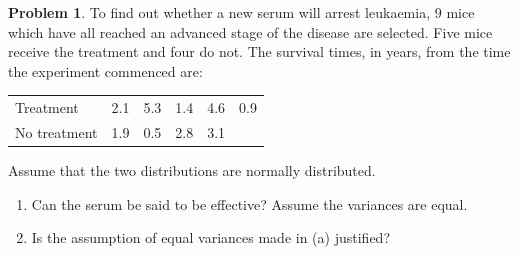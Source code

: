 \documentclass[11pt,a4paper]{article}
\theoremstyle{definition}
\newtheorem{problemx}{Problem}[section]
\newenvironment{problem}{\begin{problemx}}{\end{problemx}}
\begin{document}
\begin{problem}
To find out whether a new serum will arrest leukaemia, $9$ mice which have all reached an
advanced stage of the disease are selected. Five mice receive the treatment and four do not.
The survival times, in years, from the time the experiment commenced are:
\begin{table}[H]
\centering
\begin{tabular}{l|ccccc}
Treatment & 2.1 & 5.3 & 1.4 & 4.6 & 0.9\\
No treatment & 1.9 & 0.5 & 2.8 & 3.1 & \\
\end{tabular}
\end{table}
Assume that the two distributions are normally distributed.
\begin{enumerate}
\item[(a).] Can the serum be said to be effective? Assume the variances are equal.
\item[(b).] Is the assumption of equal variances made in (a) justified?
\end{enumerate}
\end{problem}
\end{document}
